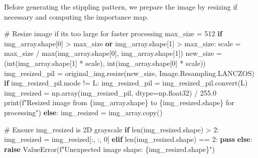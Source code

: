 \documentclass[
  letterpaper,
  DIV=11,
  numbers=noendperiod]{scrartcl}
\newenvironment{Shaded}{\begin{snugshade}}{\end{snugshade}}
\newcommand{\BuiltInTok}[1]{\textcolor[rgb]{0.00,0.23,0.31}{#1}}
\newcommand{\CommentTok}[1]{\textcolor[rgb]{0.37,0.37,0.37}{#1}}
\newcommand{\ControlFlowTok}[1]{\textcolor[rgb]{0.00,0.23,0.31}{\textbf{#1}}}
\newcommand{\DecValTok}[1]{\textcolor[rgb]{0.68,0.00,0.00}{#1}}
\newcommand{\FloatTok}[1]{\textcolor[rgb]{0.68,0.00,0.00}{#1}}
\newcommand{\KeywordTok}[1]{\textcolor[rgb]{0.00,0.23,0.31}{\textbf{#1}}}
\newcommand{\NormalTok}[1]{\textcolor[rgb]{0.00,0.23,0.31}{#1}}
\newcommand{\OperatorTok}[1]{\textcolor[rgb]{0.37,0.37,0.37}{#1}}
\newcommand{\PreprocessorTok}[1]{\textcolor[rgb]{0.68,0.00,0.00}{#1}}
\newcommand{\SpecialCharTok}[1]{\textcolor[rgb]{0.37,0.37,0.37}{#1}}
\newcommand{\SpecialStringTok}[1]{\textcolor[rgb]{0.13,0.47,0.30}{#1}}
\newcommand{\StringTok}[1]{\textcolor[rgb]{0.13,0.47,0.30}{#1}}
\begin{document}
Before generating the stippling pattern, we prepare the image by
resizing if necessary and computing the importance map.

\label{prep-image}
\begin{Shaded}
\begin{Highlighting}[]
\CommentTok{\# Resize image if it\textquotesingle{}s too large for faster processing}
\NormalTok{max\_size }\OperatorTok{=} \DecValTok{512}
\ControlFlowTok{if}\NormalTok{ img\_array.shape[}\DecValTok{0}\NormalTok{] }\OperatorTok{\textgreater{}}\NormalTok{ max\_size }\KeywordTok{or}\NormalTok{ img\_array.shape[}\DecValTok{1}\NormalTok{] }\OperatorTok{\textgreater{}}\NormalTok{ max\_size:}
\NormalTok{    scale }\OperatorTok{=}\NormalTok{ max\_size }\OperatorTok{/} \BuiltInTok{max}\NormalTok{(img\_array.shape[}\DecValTok{0}\NormalTok{], img\_array.shape[}\DecValTok{1}\NormalTok{])}
\NormalTok{    new\_size }\OperatorTok{=}\NormalTok{ (}\BuiltInTok{int}\NormalTok{(img\_array.shape[}\DecValTok{1}\NormalTok{] }\OperatorTok{*}\NormalTok{ scale), }\BuiltInTok{int}\NormalTok{(img\_array.shape[}\DecValTok{0}\NormalTok{] }\OperatorTok{*}\NormalTok{ scale))}
\NormalTok{    img\_resized\_pil }\OperatorTok{=}\NormalTok{ original\_img.resize(new\_size, Image.Resampling.LANCZOS)}
    \ControlFlowTok{if}\NormalTok{ img\_resized\_pil.mode }\OperatorTok{!=} \StringTok{\textquotesingle{}L\textquotesingle{}}\NormalTok{:}
\NormalTok{        img\_resized\_pil }\OperatorTok{=}\NormalTok{ img\_resized\_pil.convert(}\StringTok{\textquotesingle{}L\textquotesingle{}}\NormalTok{)}
\NormalTok{    img\_resized }\OperatorTok{=}\NormalTok{ np.array(img\_resized\_pil, dtype}\OperatorTok{=}\NormalTok{np.float32) }\OperatorTok{/} \FloatTok{255.0}
    \BuiltInTok{print}\NormalTok{(}\SpecialStringTok{f"Resized image from }\SpecialCharTok{\{}\NormalTok{img\_array}\SpecialCharTok{.}\NormalTok{shape}\SpecialCharTok{\}}\SpecialStringTok{ to }\SpecialCharTok{\{}\NormalTok{img\_resized}\SpecialCharTok{.}\NormalTok{shape}\SpecialCharTok{\}}\SpecialStringTok{ for processing"}\NormalTok{)}
\ControlFlowTok{else}\NormalTok{:}
\NormalTok{    img\_resized }\OperatorTok{=}\NormalTok{ img\_array.copy()}

\CommentTok{\# Ensure img\_resized is 2D grayscale}
\ControlFlowTok{if} \BuiltInTok{len}\NormalTok{(img\_resized.shape) }\OperatorTok{\textgreater{}} \DecValTok{2}\NormalTok{:}
\NormalTok{    img\_resized }\OperatorTok{=}\NormalTok{ img\_resized[:, :, }\DecValTok{0}\NormalTok{]}
\ControlFlowTok{elif} \BuiltInTok{len}\NormalTok{(img\_resized.shape) }\OperatorTok{==} \DecValTok{2}\NormalTok{:}
    \ControlFlowTok{pass}
\ControlFlowTok{else}\NormalTok{:}
    \ControlFlowTok{raise} \PreprocessorTok{ValueError}\NormalTok{(}\SpecialStringTok{f"Unexpected image shape: }\SpecialCharTok{\{}\NormalTok{img\_resized}\SpecialCharTok{.}\NormalTok{shape}\SpecialCharTok{\}}\SpecialStringTok{"}\NormalTok{)}


\end{Highlighting}
\end{Shaded}
\end{document}
